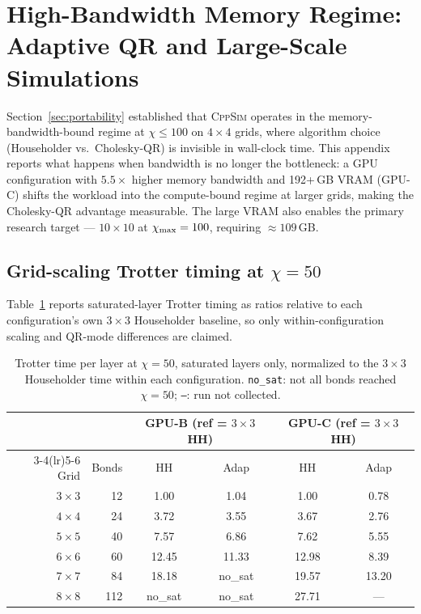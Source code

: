 \section{High-Bandwidth Memory Regime: Adaptive QR and Large-Scale Simulations}
\label{app:mi355x}

Section~\ref{sec:portability} established that \textsc{CppSim} operates in the
memory-bandwidth-bound regime at $\chi \leq 100$ on $4\times4$ grids, where
algorithm choice (Householder vs.\ Cholesky-QR) is invisible in wall-clock time.
This appendix reports what happens when bandwidth is no longer the bottleneck:
a GPU configuration with $5.5\times$ higher memory bandwidth and 192+\,GB VRAM
(GPU-C) shifts the workload into the
compute-bound regime at larger grids, making the Cholesky-QR advantage measurable.
The large VRAM also enables the primary research target --- $10\times10$ at
$\chi_{\mathrm{max}}=100$, requiring $\approx109$\,GB.

\subsection{Grid-scaling Trotter timing at $\chi = 50$}

Table~\ref{tab:grid_scaling_mi355x} reports saturated-layer Trotter timing
as ratios relative to each configuration's own $3\times3$ Householder baseline,
so only within-configuration scaling and QR-mode differences are claimed.

\begin{table}[H]
\centering
\caption{Trotter time per layer at $\chi=50$, saturated layers only, normalized
 to the $3\times3$ Householder time within each configuration.
 \texttt{no\_sat}: not all bonds reached $\chi=50$;
 \texttt{---}: run not collected.}
\label{tab:grid_scaling_mi355x}
\smallskip
\small
\begin{tabular}{r r cc cc}
\toprule
& & \multicolumn{2}{c}{GPU-B (ref = $3\times3$ HH)} & \multicolumn{2}{c}{GPU-C (ref = $3\times3$ HH)} \\
\cmidrule(lr){3-4}\cmidrule(lr){5-6}
Grid & Bonds & HH & Adap & HH & Adap \\
\midrule
$3\times3$ & 12 & 1.00 & 1.04 & 1.00 & 0.78 \\
$4\times4$ & 24 & 3.72 & 3.55 & 3.67 & 2.76 \\
$5\times5$ & 40 & 7.57 & 6.86 & 7.62 & 5.55 \\
$6\times6$ & 60 & 12.45 & 11.33 & 12.98 & 8.39 \\
$7\times7$ & 84 & 18.18 & no\_sat & 19.57 & 13.20 \\
$8\times8$ & 112 & no\_sat & no\_sat & 27.71 & --- \\
\bottomrule
\end{tabular}
\end{table}

